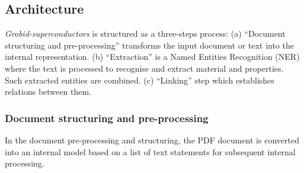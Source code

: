 \documentclass{article}
\begin{document}


\subsection{Architecture}

\textit{Grobid-superconductors} is structured as a three-steps process: (a) ``Document structuring and pre-processing'' transforms the input document or text into the internal representation. (b) ``Extraction'' is a Named Entities Recognition (NER) where the text is processed to recognise and extract material and properties. Such extracted entities are combined. (c) ``Linking''  step which establishes relations between them. 


\subsubsection{Document structuring and pre-processing}
\label{subsubsec:document-structuring}
In the document pre-processing and structuring, the PDF document is converted into an internal model based on a list of text statements for subsequent internal processing.
\end{document}
